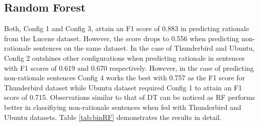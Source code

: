 \documentclass[a4paper,12pt,twoside]{report}
\begin{document}
\subsection{Random Forest}
Both, Config 1 and Config 3, attain an F1 score of 0.883 in predicting rationale from the Lucene dataset. However, the score drops to 0.556 when predicting non-rationale sentences on the same dataset. In the case of Thunderbird and Ubuntu, Config 2 outshines other configurations when predicting rationale in sentences with F1 scores of 0.619 and 0.670 respectively. However, in the case of predicting non-rationale sentences Config 4 works the best with 0.757 as the F1 score for Thunderbird dataset while Ubuntu dataset required Config 1 to attain an F1 score of 0.715. Observations similar to that of DT can be noticed as RF performs better in classifiying non-rationale sentences when fed with Thunderbird and Ubuntu datasets. Table \ref{tab:binRF} demonstrates the results in detail. 
\end{document}
